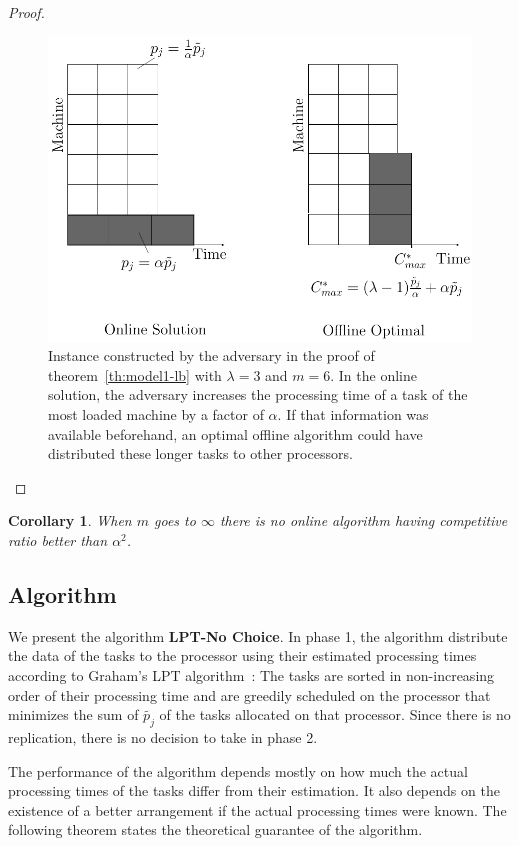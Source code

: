 \documentclass[10pt, conference, compsocconf]{IEEEtran}
\newtheorem{corollary}{Corollary}[theorem]
\begin{document}
\begin{proof}
  \begin{figure}[htp]
  \centering
  \includegraphics[width= 8 cm]{model1.pdf}
  \caption{Instance constructed by the adversary in the proof of
    theorem~\ref{th:model1-lb} with $\lambda = 3$ and $m = 6$. In the
    online solution, the adversary increases 
    the processing time of a task of the most loaded machine by a factor of $\alpha$. If
    that information was available beforehand, an optimal offline
    algorithm could have distributed these longer tasks to other
    processors.}
  \label{fig:rara}
  \end{figure}
\end{proof}    
  
  
  \begin{corollary}
  When $m$ goes to $\infty$ there is no online algorithm having competitive ratio better than $\alpha^{2}$.
  \end{corollary}
  
\subsection{Algorithm}

We present the algorithm \textbf{LPT-No Choice}. In phase 1, the
algorithm distribute the data of the tasks to the processor using
their estimated processing times according to Graham's LPT
algorithm~\cite{Graham69boundson}: The tasks are sorted in non-increasing
order of their processing time and are greedily scheduled on the
processor that minimizes the sum of $\tilde{p_j}$ of the tasks
allocated on that processor. Since there is no replication, there is
no decision to take in phase 2.

The performance of the algorithm depends mostly on how much the actual
processing times of the tasks differ from their estimation. It also depends on the
existence of a better arrangement if the actual processing times were
known. The following theorem states the theoretical guarantee of the
algorithm.
\end{document}
